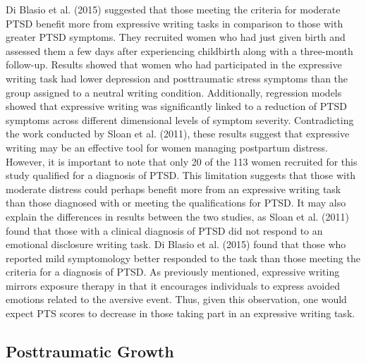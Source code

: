 \documentclass[english,man, mask]{apa6}
\theoremstyle{definition}
\theoremstyle{definition}
\theoremstyle{definition}
\theoremstyle{remark}
\begin{document}
Di Blasio et al. (2015) suggested that those meeting the criteria for
moderate PTSD benefit more from expressive writing tasks in comparison
to those with greater PTSD symptoms. They recruited women who had just
given birth and assessed them a few days after experiencing childbirth
along with a three-month follow-up. Results showed that women who had
participated in the expressive writing task had lower depression and
posttraumatic stress symptoms than the group assigned to a neutral
writing condition. Additionally, regression models showed that
expressive writing was significantly linked to a reduction of PTSD
symptoms across different dimensional levels of symptom severity.
Contradicting the work conducted by Sloan et al. (2011), these results
suggest that expressive writing may be an effective tool for women
managing postpartum distress. However, it is important to note that only
20 of the 113 women recruited for this study qualified for a diagnosis
of PTSD. This limitation suggests that those with moderate distress
could perhaps benefit more from an expressive writing task than those
diagnosed with or meeting the qualifications for PTSD. It may also
explain the differences in results between the two studies, as Sloan et
al. (2011) found that those with a clinical diagnosis of PTSD did not
respond to an emotional disclosure writing task. Di Blasio et al. (2015)
found that those who reported mild symptomology better responded to the
task than those meeting the criteria for a diagnosis of PTSD. As
previously mentioned, expressive writing mirrors exposure therapy in
that it encourages individuals to express avoided emotions related to
the aversive event. Thus, given this observation, one would expect PTS
scores to decrease in those taking part in an expressive writing task.

\subsection{Posttraumatic Growth}\label{posttraumatic-growth}
\end{document}

